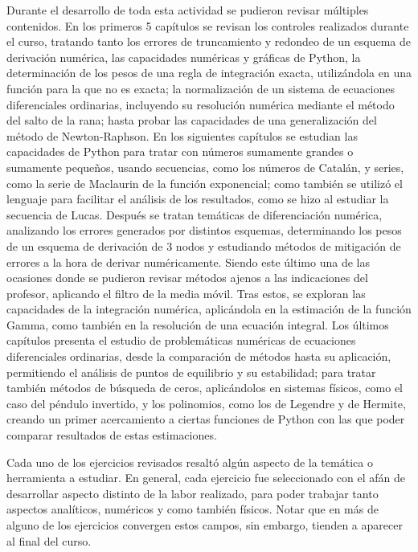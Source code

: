\documentclass[../portafolio.tex]{subfiles}
\begin{document}
Durante el desarrollo de toda esta actividad se pudieron revisar múltiples contenidos. En los primeros 5 capítulos se revisan los controles realizados durante el curso, tratando tanto los errores de truncamiento y redondeo de un esquema de derivación numérica, las capacidades numéricas y gráficas de Python, la determinación de los pesos de una regla de integración exacta, utilizándola en una función para la que no es exacta; la normalización de un sistema de ecuaciones diferenciales ordinarias, incluyendo su resolución numérica mediante el método del salto de la rana; hasta probar las capacidades de una generalización del método de Newton-Raphson. En los siguientes capítulos se estudian las capacidades de Python para tratar con números sumamente grandes o sumamente pequeños, usando secuencias, como los números de Catalán, y series, como la serie de Maclaurin de la función exponencial; como también se utilizó el lenguaje para facilitar el análisis de los resultados, como se hizo al estudiar la secuencia de Lucas. Después se tratan temáticas de diferenciación numérica, analizando los errores generados por distintos esquemas, determinando los pesos de un esquema de derivación de 3 nodos y estudiando métodos de mitigación de errores a la hora de derivar numéricamente. Siendo este último una de las ocasiones donde se pudieron revisar métodos ajenos a las indicaciones del profesor, aplicando el filtro de la media móvil. Tras estos, se exploran las capacidades de la integración numérica, aplicándola en la estimación de la función Gamma, como también en la resolución de una ecuación integral. Los últimos capítulos presenta el estudio de problemáticas numéricas de ecuaciones diferenciales ordinarias, desde la comparación de métodos hasta su aplicación, permitiendo el análisis de puntos de equilibrio y su estabilidad; para tratar también métodos de búsqueda de ceros, aplicándolos en sistemas físicos, como el caso del péndulo invertido, y los polinomios, como los de Legendre y de Hermite, creando un primer acercamiento a ciertas funciones de Python con las que poder comparar resultados de estas estimaciones.


Cada uno de los ejercicios revisados resaltó algún aspecto de la temática o herramienta a estudiar. En general, cada ejercicio fue seleccionado con el afán de desarrollar aspecto distinto de la labor realizado, para poder trabajar tanto aspectos analíticos, numéricos y como también físicos. Notar que en más de alguno de los ejercicios convergen estos campos, sin embargo, tienden a aparecer al final del curso. 
\end{document}
